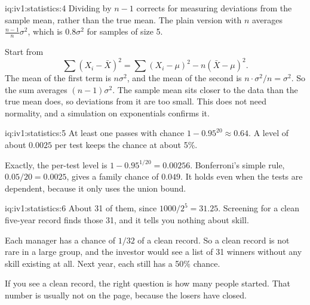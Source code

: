 \begin{solution}{iq:iv1:statistics:4}
Dividing by $n - 1$ corrects for measuring deviations from the sample mean, rather than the true mean. The plain version with $n$ averages $\frac{n - 1}{n}\sigma^2$, which is $0.8\sigma^2$ for samples of size 5.

Start from
\[
\sum (X_i - \bar{X})^2 = \sum (X_i - \mu)^2 - n(\bar{X} - \mu)^2.
\]
The mean of the first term is $n\sigma^2$, and the mean of the second is $n \cdot \sigma^2/n = \sigma^2$. So the sum averages $(n - 1)\sigma^2$. The sample mean sits closer to the data than the true mean does, so deviations from it are too small. This does not need normality, and a simulation on exponentials confirms it.

\end{solution}

\begin{solution}{iq:iv1:statistics:5}
At least one passes with chance $1 - 0.95^{20} \approx 0.64$. A level of about $0.0025$ per test keeps the chance at about 5\%.

Exactly, the per-test level is $1 - 0.95^{1/20} = 0.00256$. Bonferroni's simple rule, $0.05/20 = 0.0025$, gives a family chance of $0.049$. It holds even when the tests are dependent, because it only uses the union bound.

\end{solution}

\begin{solution}{iq:iv1:statistics:6}
About 31 of them, since $1000/2^5 = 31.25$. Screening for a clean five-year record finds those 31, and it tells you nothing about skill.

Each manager has a chance of $1/32$ of a clean record. So a clean record is not rare in a large group, and the investor would see a list of 31 winners without any skill existing at all. Next year, each still has a 50\% chance.

If you see a clean record, the right question is how many people started. That number is usually not on the page, because the losers have closed.

\end{solution}

